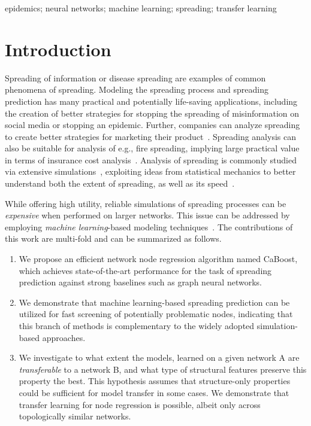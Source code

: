 \documentclass{article}
\begin{document}
\begin{keywords}
epidemics; neural networks; machine learning; spreading; transfer learning
\end{keywords}

\section{Introduction}\label{sec:intro}
Spreading of information or disease spreading are examples of common phenomena of spreading. Modeling the spreading process and spreading prediction has many practical and potentially life-saving applications, including the creation of better strategies for stopping the spreading of misinformation on social media or stopping an epidemic. Further, companies can analyze spreading to create better strategies for marketing their product~\cite{Guille2013diffusion,nowzari2016analysis}. Spreading analysis can also be suitable for analysis of e.g., fire spreading, implying large practical value in terms of insurance cost analysis~\cite{kacem2017small}. Analysis of spreading is commonly studied via extensive simulations~\cite{kesarev2018parallel}, exploiting ideas from statistical mechanics to better understand both the extent of spreading, as well as its speed~\cite{dong2018studies}. 

While offering high utility, reliable simulations of spreading processes can be \emph{expensive} when performed on larger networks. This issue can be addressed by employing \emph{machine learning}-based modeling techniques~\cite{wu2020comprehensive}. The contributions of this work are multi-fold and can be summarized as follows.
\begin{enumerate}
    \item We propose an efficient network node regression algorithm named CaBoost, which achieves state-of-the-art performance for the task of spreading prediction against strong baselines such as graph neural networks.
    \item We demonstrate that machine learning-based spreading prediction can be utilized for fast screening of potentially problematic nodes, indicating that this branch of methods is complementary to the widely adopted simulation-based approaches.
    \item We investigate to what extent the models, learned on a given network A are \emph{transferable} to a network B, and what type of structural features preserve this property the best. This hypothesis assumes that structure-only properties could be sufficient for model transfer in some cases. We demonstrate that transfer learning for node regression is possible, albeit only across topologically similar networks.
\end{enumerate}
\end{document}

